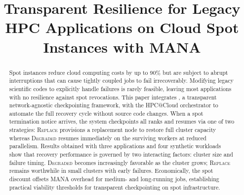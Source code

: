 \documentclass[conference]{IEEEtran}
\begin{document}
\title{Transparent Resilience for Legacy HPC Applications on Cloud Spot Instances with MANA%
}

\author{
}

\maketitle

\begin{abstract}
Spot instances reduce cloud computing costs by up to 90\% but are subject to abrupt interruptions that can cause tightly coupled \MPI jobs to fail irrecoverably.
Modifying legacy scientific codes to explicitly handle failures is rarely feasible, leaving
most applications with no resilience against spot revocations.
This paper integrates \MANA, a transparent network-agnostic \MPI checkpointing framework,
with the HPC@Cloud orchestrator to automate the full recovery cycle without source code
changes.
When a spot termination notice arrives, the system checkpoints all ranks and resumes via
one of two strategies: \textsc{Replace} provisions a replacement node to restore full
cluster capacity whereas \textsc{Degraded} resumes immediately on the surviving workers at
reduced parallelism.
Results obtained with three \NPB applications and four synthetic workloads show that
recovery performance is governed by two interacting factors: cluster size and failure
timing.
\textsc{Degraded} becomes increasingly favorable as the cluster grows; \textsc{Replace}
remains worthwhile in small clusters with early failures.
Economically, the spot discount offsets MANA overhead for medium- and long-running jobs,
establishing practical viability thresholds for transparent checkpointing on spot
infrastructure.
\end{abstract}
\end{document}
